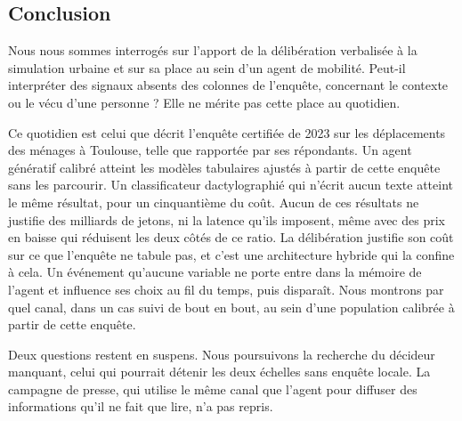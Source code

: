 \subsection{Conclusion}
\label{sec:conclusion}

Nous nous sommes interrogés sur l'apport de la délibération verbalisée à la simulation urbaine et sur sa place au sein d'un agent de mobilité. Peut-il interpréter des signaux absents des colonnes de l'enquête, concernant le contexte ou le vécu d'une personne ? Elle ne mérite pas cette place au quotidien.

Ce quotidien est celui que décrit l'enquête certifiée de 2023 sur les déplacements des ménages à Toulouse, telle que rapportée par ses répondants. Un agent génératif calibré atteint les modèles tabulaires ajustés à partir de cette enquête sans les parcourir. Un classificateur dactylographié qui n'écrit aucun texte atteint le même résultat, pour un cinquantième du coût. Aucun de ces résultats ne justifie des milliards de jetons, ni la latence qu'ils imposent, même avec des prix en baisse qui réduisent les deux côtés de ce ratio. La délibération justifie son coût sur ce que l'enquête ne tabule pas, et c'est une architecture hybride qui la confine à cela. Un événement qu'aucune variable ne porte entre dans la mémoire de l'agent et influence ses choix au fil du temps, puis disparaît. Nous montrons par quel canal, dans un cas suivi de bout en bout, au sein d'une population calibrée à partir de cette enquête.

Deux questions restent en suspens. Nous poursuivons la recherche du décideur manquant, celui qui pourrait détenir les deux échelles sans enquête locale. La campagne de presse, qui utilise le même canal que l'agent pour diffuser des informations qu'il ne fait que lire, n'a pas repris.
